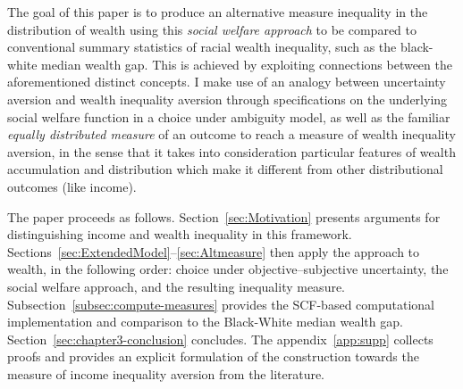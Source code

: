 \documentclass[Chp3.tex]{subfiles}
\begin{document}
\par The goal of this paper is to produce an alternative measure inequality in the distribution of wealth using this \textit{social welfare approach} to be compared to conventional summary statistics of racial wealth inequality, such as the black-white median wealth gap. This is achieved by exploiting connections between the aforementioned distinct concepts. I make use of an analogy between uncertainty aversion and wealth inequality aversion through specifications on the underlying social welfare function in a choice under ambiguity model, as well as the familiar \textit{equally distributed measure} of an outcome to reach a measure of wealth inequality aversion, in the sense that it takes into consideration particular features of wealth accumulation and distribution which make it different from other distributional outcomes (like income). 
\par The paper proceeds as follows. Section~\ref{sec:Motivation} presents arguments for distinguishing income and wealth inequality in this framework. Sections~\ref{sec:ExtendedModel}--\ref{sec:Altmeasure} then apply the approach to wealth, in the following order: choice under objective--subjective uncertainty, the social welfare approach, and the resulting inequality measure. Subsection~\ref{subsec:compute-measures} provides the SCF-based computational implementation and comparison to the Black-White median wealth gap. Section~\ref{sec:chapter3-conclusion} concludes. The appendix~\ref{app:supp} collects proofs and provides an explicit formulation of the construction towards the measure of income inequality aversion from the literature.
\end{document}

